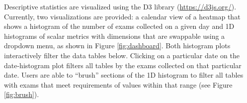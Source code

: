 Descriptive statistics are visualized using the D3 library (\href{https://d3js.org/}{https://d3js.org/}). Currently, two visualizations are provided: a calendar view of a heatmap that shows a histogram of the number of exams collected on a given day and 1D histograms of scalar metrics with dimensions that are swappable using a dropdown menu, as shown in Figure \ref{fig:dashboard}. Both histogram plots interactively filter the data tables below. Clicking on a particular date on the date-histogram plot filters all tables by the exams collected on that particular date. Users are able to ``brush'' sections of the 1D histogram to filter all tables with exams that meet requirements of values within that range (see Figure \ref{fig:brush}).  